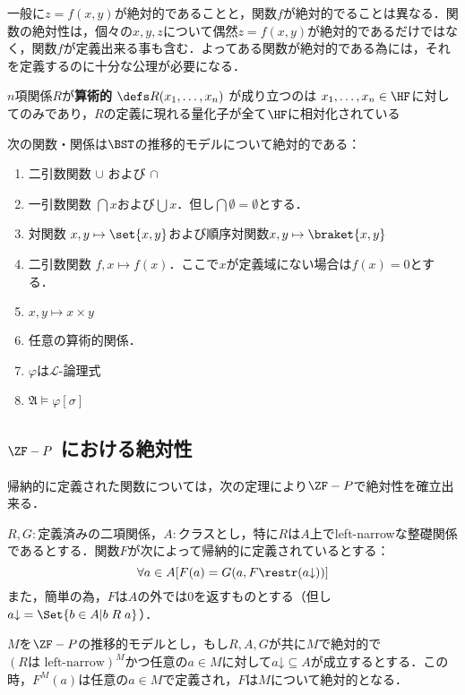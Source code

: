 \documentclass[a4j]{ltjsarticle}
\begin{document}
一般に$z = f(x,y)$が絶対的であることと，関数$f$が絶対的でることは異なる．関数の絶対性は，個々の$x, y, z$について偶然$z = f(x,y)$が絶対的であるだけではなく，関数$f$が定義出来る事も含む．よってある関数が絶対的である為には，それを定義するのに十分な公理が必要になる．

\begin{definition}
 $n$項関係$R$が{\bfseries 算術的} $\defs R(x_1, \dots, x_n)$ が成り立つのは $x_1, \dots, x_n \in \HF$に対してのみであり，$R$の定義に現れる量化子が全て$\HF$に相対化されている
\end{definition}

\begin{theorem}
 次の関数・関係は$\BST$の推移的モデルについて絶対的である：

 \begin{enumerate}
  \item 二引数関数 $\cup$ および $\cap$
  \item 一引数関数 $\bigcap x$および$\bigcup x$．但し$\bigcap \emptyset = \emptyset$とする．
  \item 対関数 $x, y \mapsto \set{x,y}$および順序対関数$x, y \mapsto \braket{x, y}$
  \item 二引数関数 $f, x \mapsto f(x)$．ここで$x$が定義域にない場合は$f(x) = 0$とする．
  \item $x, y \mapsto x \times y$
  \item 任意の算術的関係．
  \item $\varphi$は$\mathcal{L}$-論理式
  \item $\mathfrak{A} \models \varphi[\sigma]$
 \end{enumerate}
\end{theorem}

\subsection{$\ZF-P$ における絶対性}

帰納的に定義された関数については，次の定理により$\ZF-P$で絶対性を確立出来る．

\begin{theorem}[帰納的に定義され関数の絶対性]
 $R, G:$定義済みの二項関係，$A:$クラスとし，特に$R$は$A$上でleft-narrowな整礎関係であるとする．関数$F$が次によって帰納的に定義されているとする：
 \[
  \forall a \in A [F(a) = G(a, F \restr (a\mathord{\downarrow}))]
 \]
 また，簡単の為，$F$は$A$の外では$0$を返すものとする（但し$a \mathord{\downarrow} = \Set{b \in A | b \mathrel{R} a}$）．

 $M$を$\ZF-P$の推移的モデルとし，もし$R, A, G$が共に$M$で絶対的で$(R \text{は left-narrow})^M$かつ任意の$a \in M$に対して$a \mathord{\downarrow} \subseteq A$が成立するとする．この時，$F^M(a)$は任意の$a \in M$で定義され，$F$は$M$について絶対的となる．
\end{theorem}
\end{document}
